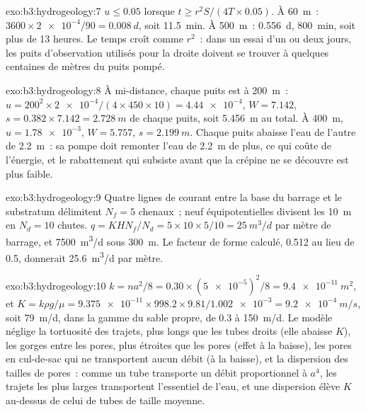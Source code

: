 \begin{solution}{exo:b3:hydrogeology:7}
$u \le 0.05$ lorsque $t \ge r^2S/(4T\times0.05)$. À \qty{60}{m}~: $3600\times
\num{2e-4}/90 = \qty{0.008}{d}$, soit \qty{11.5}{min}. À \qty{500}{m}~:
\qty{0.556}{d}, \qty{800}{min}, soit plus de 13 heures. Le temps croît comme $r^2$~:
dans un essai d'un ou deux jours, les puits d'observation utilisés pour la droite
doivent se trouver à quelques centaines de mètres du puits pompé.
\end{solution}

\begin{solution}{exo:b3:hydrogeology:8}
À mi-distance, chaque puits est à \qty{200}{m}~: $u = 200^2\times\num{2e-4}/(4
\times450\times10) = \num{4.44e-4}$, $W = \num{7.142}$, $s = 0.382\times
7.142 = \qty{2.728}{m}$ de chaque puits, soit \qty{5.456}{m} au total. À
\qty{400}{m}, $u = \num{1.78e-3}$, $W = \num{5.757}$, $s =
\qty{2.199}{m}$. Chaque puits abaisse l'eau de l'autre de
\qty{2.2}{m}~: sa pompe doit remonter l'eau de \qty{2.2}{m} de plus, ce qui
coûte de l'énergie, et le rabattement qui subsiste avant que la crépine ne
se découvre est plus faible.
\end{solution}

\begin{solution}{exo:b3:hydrogeology:9}
Quatre lignes de courant entre la base du barrage et le substratum délimitent $N_f = 5$
chenaux~; neuf équipotentielles divisent les \qty{10}{m} en $N_d = 10$
chutes. $q = KHN_f/N_d = 5\times10\times5/10 = \qty{25}{m^3/d}$ par mètre
de barrage, et \qty{7500}{m^3/d} sous \qty{300}{m}. Le facteur de forme calculé,
0.512 au lieu de 0.5, donnerait \qty{25.6}{m^3/d} par mètre.
\end{solution}

\begin{solution}{exo:b3:hydrogeology:10}
$k = na^2/8 = 0.30\times(\num{5e-5})^2/8 = \qty{9.4e-11}{m^2}$, et $K =
k\rho g/\mu = \num{9.375e-11}\times998.2\times9.81/\num{1.002e-3} =
\qty{9.2e-4}{m/s}$, soit \qty{79}{m/d}, dans la gamme du sable propre, de 0.3 à
\qty{150}{m/d}. Le modèle néglige la tortuosité des trajets, plus longs que
les tubes droits (elle abaisse $K$), les gorges entre les pores, plus étroites
que les pores (effet à la baisse), les pores en cul-de-sac qui ne transportent
aucun débit (à la baisse), et la dispersion des tailles de pores~: comme un tube
transporte un débit proportionnel à $a^4$, les trajets les plus larges
transportent l'essentiel de l'eau, et une dispersion élève $K$ au-dessus de celui de tubes de taille moyenne.
\end{solution}

